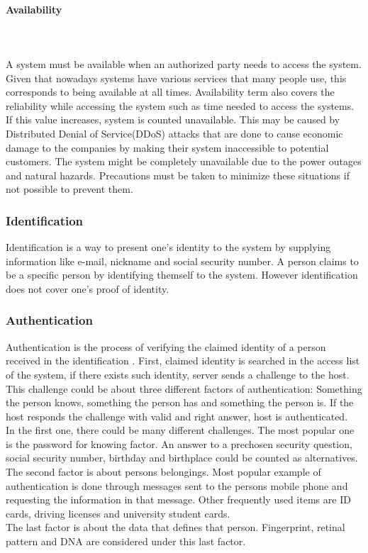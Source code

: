 \documentclass[a4paper, 12pt, titlepage]{article}
\begin{document}
\paragraph{Availability}\mbox{}\\
\\A system must be available when an authorized party needs to access the system. Given that nowadays systems have various services that many people use, this corresponds to being available at all times. Availability term also covers the reliability while accessing the system such as time needed to access the systems. If this value increases, system is counted unavailable. This may be caused by Distributed Denial of Service(DDoS) attacks that are done to cause economic damage to the companies by making their system inaccessible to potential customers. The system might be completely unavailable due to the power outages and natural hazards. Precautions must be taken to minimize these situations if not possible to prevent them\cite{confidentiality}.
\subsubsection{Identification}
Identification is a way to present one’s identity to the system by supplying information like e-mail, nickname and social security number\cite{identification}. A person claims to be a specific person by identifying themself to the system. However identification does not cover one’s proof of identity\cite{ident}.
\subsubsection{Authentication}
Authentication is the process of verifying the claimed identity of a person received in the identification \cite{identification}. First, claimed identity is searched in the access list of the system, if there exists such identity, server sends a challenge to the host. This challenge could be about three different factors of authentication: Something the person knows, something the person has and something the person is. If the host responds the challenge with valid and right answer, host is authenticated\cite{authfactor}.
\bigskip
\\In the first one, there could be many different challenges. The most popular one is the password for knowing factor. An answer to a prechosen security question, social security number, birthday and birthplace could be counted as alternatives.
\bigskip
\\The second factor is about persons belongings. Most popular example of authentication is done through messages sent to the persons mobile phone and requesting the information in that message. Other frequently used items are ID cards, driving licenses and university student cards.
\bigskip
\\The last factor is about the data that defines that person. Fingerprint, retinal pattern and DNA are considered under this last factor.
\end{document}
